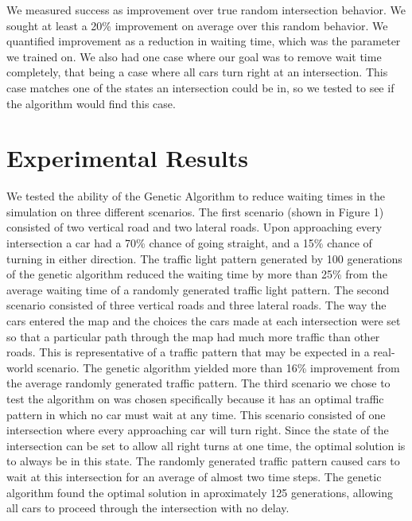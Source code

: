 \documentclass[12pt, letterpaper]{article}
\begin{document}
We measured success as improvement over true random intersection behavior.
We sought at least a 20\% improvement on average over this random behavior.
We quantified improvement as a reduction in waiting time, which was the parameter we trained on.
We also had one case where our goal was to remove wait time completely, that being a case where all cars turn right at an intersection.
This case matches one of the states an intersection could be in, so we tested to see if the algorithm would find this case.


\section*{Experimental Results}

We tested the ability of the Genetic Algorithm to reduce waiting times in the simulation on three different scenarios. The first scenario (shown in Figure 1) consisted of two vertical road and two lateral roads. Upon approaching every intersection a car had a 70\% chance of going straight, and a 15\% chance of turning in either direction. The traffic light pattern generated by 100 generations of the genetic algorithm reduced the waiting time by more than 25\% from the average waiting time of a randomly generated traffic light pattern. The second scenario consisted of three vertical roads and three lateral roads. The way the cars entered the map and the choices the cars made at each intersection were set so that a particular path through the map had much more traffic than other roads. This is representative of a traffic pattern that may be expected in a real-world scenario. The genetic algorithm yielded more than 16\% improvement from the average randomly generated traffic pattern. The third scenario we chose to test the algorithm on was chosen specifically because it has an optimal traffic pattern in which no car must wait at any time. This scenario consisted of one intersection where every approaching car will turn right. Since the state of the intersection can be set to allow all right turns at one time, the optimal solution is to always be in this state. The randomly generated traffic pattern caused cars to wait at this intersection for an average of almost two time steps. The genetic algorithm found the optimal solution in aproximately 125 generations, allowing all cars to proceed through the intersection with no delay.
\end{document}
